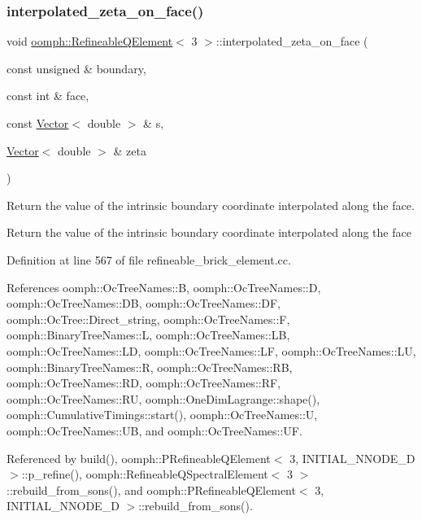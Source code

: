 \subsubsection{\texorpdfstring{interpolated\+\_\+zeta\+\_\+on\+\_\+face()}{interpolated\_zeta\_on\_face()}}
{\footnotesize\ttfamily void \hyperlink{classoomph_1_1RefineableQElement}{oomph\+::\+Refineable\+Q\+Element}$<$ 3 $>$\+::interpolated\+\_\+zeta\+\_\+on\+\_\+face (\begin{DoxyParamCaption}\item[{const unsigned \&}]{boundary,  }\item[{const int \&}]{face,  }\item[{const \hyperlink{classoomph_1_1Vector}{Vector}$<$ double $>$ \&}]{s,  }\item[{\hyperlink{classoomph_1_1Vector}{Vector}$<$ double $>$ \&}]{zeta }\end{DoxyParamCaption})\hspace{0.3cm}{\ttfamily [protected]}}



Return the value of the intrinsic boundary coordinate interpolated along the face. 

Return the value of the intrinsic boundary coordinate interpolated along the face 

Definition at line 567 of file refineable\+\_\+brick\+\_\+element.\+cc.



References oomph\+::\+Oc\+Tree\+Names\+::B, oomph\+::\+Oc\+Tree\+Names\+::D, oomph\+::\+Oc\+Tree\+Names\+::\+DB, oomph\+::\+Oc\+Tree\+Names\+::\+DF, oomph\+::\+Oc\+Tree\+::\+Direct\+\_\+string, oomph\+::\+Oc\+Tree\+Names\+::F, oomph\+::\+Binary\+Tree\+Names\+::L, oomph\+::\+Oc\+Tree\+Names\+::\+LB, oomph\+::\+Oc\+Tree\+Names\+::\+LD, oomph\+::\+Oc\+Tree\+Names\+::\+LF, oomph\+::\+Oc\+Tree\+Names\+::\+LU, oomph\+::\+Binary\+Tree\+Names\+::R, oomph\+::\+Oc\+Tree\+Names\+::\+RB, oomph\+::\+Oc\+Tree\+Names\+::\+RD, oomph\+::\+Oc\+Tree\+Names\+::\+RF, oomph\+::\+Oc\+Tree\+Names\+::\+RU, oomph\+::\+One\+Dim\+Lagrange\+::shape(), oomph\+::\+Cumulative\+Timings\+::start(), oomph\+::\+Oc\+Tree\+Names\+::U, oomph\+::\+Oc\+Tree\+Names\+::\+UB, and oomph\+::\+Oc\+Tree\+Names\+::\+UF.



Referenced by build(), oomph\+::\+P\+Refineable\+Q\+Element$<$ 3, I\+N\+I\+T\+I\+A\+L\+\_\+\+N\+N\+O\+D\+E\+\_\+D $>$\+::p\+\_\+refine(), oomph\+::\+Refineable\+Q\+Spectral\+Element$<$ 3 $>$\+::rebuild\+\_\+from\+\_\+sons(), and oomph\+::\+P\+Refineable\+Q\+Element$<$ 3, I\+N\+I\+T\+I\+A\+L\+\_\+\+N\+N\+O\+D\+E\+\_\+D $>$\+::rebuild\+\_\+from\+\_\+sons().

